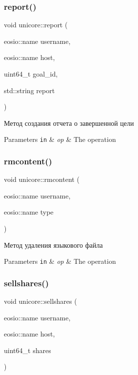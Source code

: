 \subsubsection{\texorpdfstring{report()}{report()}}
{\footnotesize\ttfamily void unicore\+::report (\begin{DoxyParamCaption}\item[{eosio\+::name}]{username,  }\item[{eosio\+::name}]{host,  }\item[{uint64\+\_\+t}]{goal\+\_\+id,  }\item[{std\+::string}]{report }\end{DoxyParamCaption})}



Метод создания отчета о завершенной цели 


\begin{DoxyParams}[1]{Parameters}
\mbox{\tt in}  & {\em op} & The operation \\
\hline
\end{DoxyParams}
\mbox{\label{classunicore_af6aac321d5880fcb577ba00abea5c38f}} 
\subsubsection{\texorpdfstring{rmcontent()}{rmcontent()}}
{\footnotesize\ttfamily void unicore\+::rmcontent (\begin{DoxyParamCaption}\item[{eosio\+::name}]{username,  }\item[{eosio\+::name}]{type }\end{DoxyParamCaption})}



Метод удаления языкового файла 


\begin{DoxyParams}[1]{Parameters}
\mbox{\tt in}  & {\em op} & The operation \\
\hline
\end{DoxyParams}
\mbox{\label{classunicore_a237ab7bb223b33ba87375e177ced89a2}} 
\subsubsection{\texorpdfstring{sellshares()}{sellshares()}}
{\footnotesize\ttfamily void unicore\+::sellshares (\begin{DoxyParamCaption}\item[{eosio\+::name}]{username,  }\item[{eosio\+::name}]{host,  }\item[{uint64\+\_\+t}]{shares }\end{DoxyParamCaption})}



